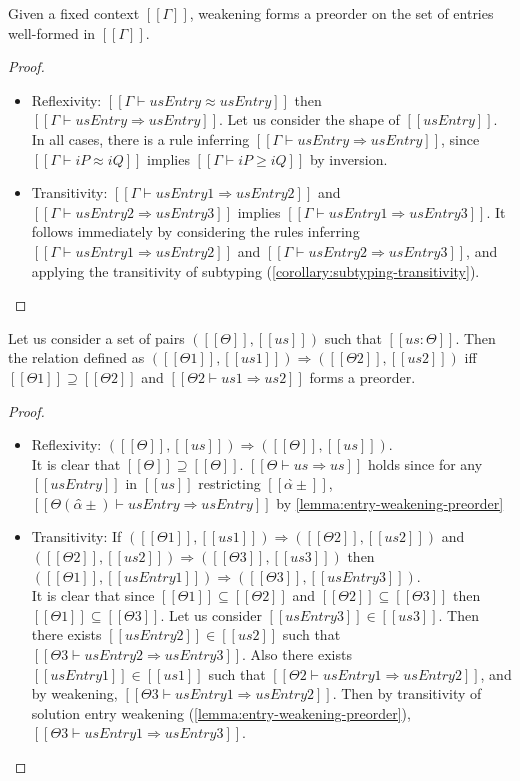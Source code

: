 \begin{lemma} \label{lemma:entry-weakening-preorder}
    Given a fixed context $[[Γ]]$, weakening forms a preorder on the set of entries well-formed in $[[Γ]]$.
\end{lemma}
\begin{proof} \hfill 
  \begin{itemize}
    \item Reflexivity: $[[Γ ⊢ usEntry ≈ usEntry]]$ then $[[Γ ⊢ usEntry ⇒ usEntry]]$.
    Let us consider the shape of $[[usEntry]]$. In all cases, there is a rule inferring
     $[[Γ ⊢ usEntry ⇒ usEntry]]$, since $[[Γ ⊢ iP ≈ iQ]]$ implies $[[Γ ⊢ iP ≥ iQ]]$ by inversion.
    \item Transitivity: $[[Γ ⊢ usEntry1 ⇒ usEntry2]]$ and $[[Γ ⊢ usEntry2 ⇒ usEntry3]]$ implies $[[Γ ⊢ usEntry1 ⇒ usEntry3]]$.
    It follows immediately by considering the rules inferring 
    $[[Γ ⊢ usEntry1 ⇒ usEntry2]]$ and $[[Γ ⊢ usEntry2 ⇒ usEntry3]]$, and applying the 
    transitivity of subtyping (\cref{corollary:subtyping-transitivity}).
  \end{itemize}
\end{proof}

\begin{lemma} 
    \label{lemma:solution-weakening-preorder}
    Let us consider a set of pairs $([[Θ]], [[us]])$ such that $[[us : Θ]]$.
    Then the relation defined as 
    $([[Θ1]], [[us1]]) \Rightarrow ([[Θ2]], [[us2]])$ iff $[[Θ1]] \supseteq [[Θ2]]$ 
    and $[[Θ2 ⊢ us1 ⇒ us2]]$ forms a preorder.
\end{lemma}
\begin{proof} \hfill
    \begin{itemize}
        \item Reflexivity: $([[Θ]], [[us]]) \Rightarrow ([[Θ]], [[us]])$.\\ It is clear that $[[Θ]] \supseteq [[Θ]]$.
        $[[Θ ⊢ us ⇒ us]]$ holds since for any $[[usEntry]]$ in $[[us]]$ restricting $[[α̂±]]$, $[[Θ(α̂±) ⊢ usEntry ⇒ usEntry]]$  
        by \cref{lemma:entry-weakening-preorder}
        \item Transitivity: If $([[Θ1]], [[us1]]) \Rightarrow ([[Θ2]], [[us2]])$ and $([[Θ2]], [[us2]]) \Rightarrow ([[Θ3]], [[us3]])$
        then $([[Θ1]], [[usEntry1]]) \Rightarrow ([[Θ3]], [[usEntry3]])$.\\
        It is clear that since $[[Θ1]] \subseteq [[Θ2]]$ and $[[Θ2]] \subseteq
        [[Θ3]]$ then $[[Θ1]] \subseteq [[Θ3]]$. Let us consider $[[usEntry3]]
        \in [[us3]]$. Then there exists $[[usEntry2]] \in [[us2]]$ such that
        $[[Θ3 ⊢ usEntry2 ⇒ usEntry3]]$. Also there exists $[[usEntry1]] \in [[us1]]$ 
        such that $[[Θ2 ⊢ usEntry1 ⇒ usEntry2]]$, and by weakening,
        $[[Θ3 ⊢ usEntry1 ⇒ usEntry2]]$. Then by transitivity of solution entry
        weakening (\cref{lemma:entry-weakening-preorder}), $[[Θ3 ⊢ usEntry1 ⇒
        usEntry3]]$.
    \end{itemize}
\end{proof}

